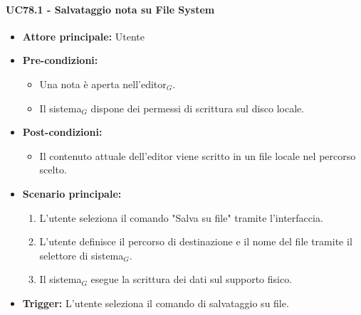 \documentclass[a4paper, 10pt]{article}
\begin{document}
\paragraph{UC78.1 - Salvataggio nota su File System}
\hypertarget{uc:78.1}{}
\begin{itemize}
    \item \textbf{Attore principale:} Utente
    \item \textbf{Pre-condizioni:} 
        \begin{itemize}
            \item Una nota è aperta nell'editor$_G$.
            \item Il sistema$_G$ dispone dei permessi di scrittura sul disco locale.
        \end{itemize}
    \item \textbf{Post-condizioni:} 
        \begin{itemize}
            \item Il contenuto attuale dell'editor viene scritto in un file locale nel percorso scelto.
        \end{itemize}
    \item \textbf{Scenario principale:}
        \begin{enumerate}
            \item L'utente seleziona il comando "Salva su file" tramite l'interfaccia.
            \item L'utente definisce il percorso di destinazione e il nome del file tramite il selettore di sistema$_G$.
            \item Il sistema$_G$ esegue la scrittura dei dati sul supporto fisico.
        \end{enumerate}
    \item \textbf{Trigger:} L'utente seleziona il comando di salvataggio su file.
\end{itemize}
\end{document}
